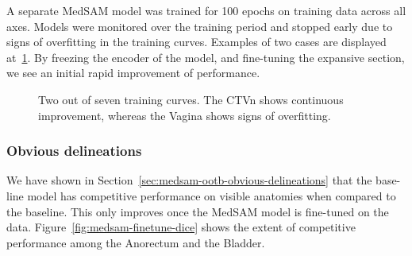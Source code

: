 \documentclass[11pt,twoside]{report}
\begin{document}
A separate MedSAM model was trained for 100 epochs on training data across all axes. Models were monitored over the training period and stopped early due to signs of overfitting in the training curves. Examples of two cases are displayed at~\ref{fig:medsam-training-curves}. By freezing the encoder of the model, and fine-tuning the expansive section, we see an initial rapid improvement of performance.

\begin{figure}[H]
  \centering
  \caption{Two out of seven training curves. The CTVn shows continuous improvement, whereas the Vagina shows signs of overfitting.}\label{fig:medsam-training-curves}
\end{figure}

\subsubsection{Obvious delineations}

We have shown in Section~\ref{sec:medsam-ootb-obvious-delineations} that the base-line model has competitive performance on visible anatomies when compared to the baseline. This only improves once the MedSAM model is fine-tuned on the data. Figure~\ref{fig:medsam-finetune-dice} shows the extent of competitive performance among the Anorectum and the Bladder.
\end{document}
